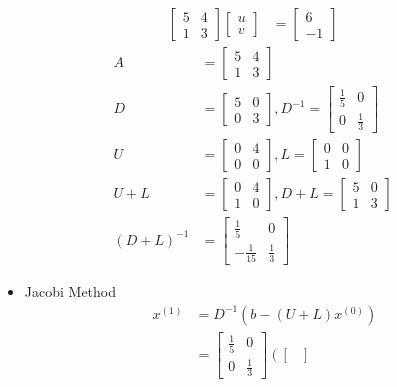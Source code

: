 \documentclass{article}
\begin{document}
\begin{enumerate}
\begin{enumerate}
\begin{align*}
\begin{bmatrix}
5&4\\ 1&3
\end{bmatrix}\begin{bmatrix}
u\\v
\end{bmatrix}&=\begin{bmatrix}
6\\-1
\end{bmatrix}
\end{align*}
\begin{align*}
A &= \begin{bmatrix}
5&4\\ 1&3
\end{bmatrix}\\
D&= \begin{bmatrix}
5&0\\ 0&3
\end{bmatrix}, D^{-1} =\begin{bmatrix}
\frac{1}{5}&0\\ 0&\frac{1}{3}
\end{bmatrix}\\
U &=\begin{bmatrix}
0&4\\ 0&0
\end{bmatrix},
L = \begin{bmatrix}
0&0\\ 1&0
\end{bmatrix}\\
U + L&=\begin{bmatrix}
0&4\\ 1&0
\end{bmatrix}, D + L=\begin{bmatrix}
5&0\\ 1&3
\end{bmatrix}\\
(D+L)^{-1} &= \begin{bmatrix}
\frac{1}{5}&0\\-\frac{1}{15}&\frac{1}{3}
\end{bmatrix}
\end{align*}
\begin{itemize}
\item Jacobi Method \begin{align*}
x^{(1)} &= D^{-1}(b- (U+L)x^{(0)})\\
&=\begin{bmatrix}
\frac{1}{5}&0\\ 0&\frac{1}{3}
\end{bmatrix}\left(\begin{bmatrix}

\end{bmatrix}
\end{align*}
\end{itemize}
\end{enumerate}
\end{enumerate}
\end{document}
